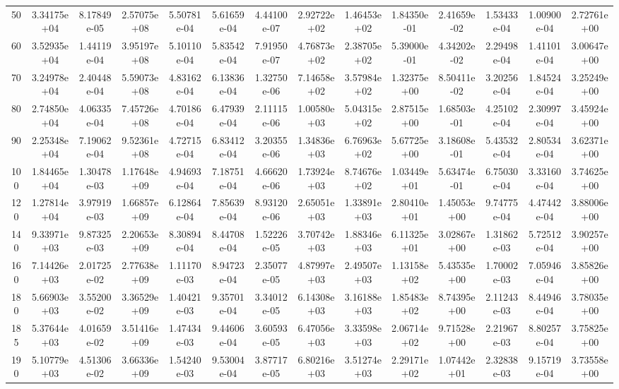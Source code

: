 \documentclass[
prb,
twocolumn,
superscriptaddress,
 amsmath,amssymb,
 aps,
longbibliography,
]{revtex4-2}
\begin{document}
\begin{table}[htbp!]
{\begin{tabular}{cccccccccccccc}
50 & 3.34175e+04 & 8.17849e-05 & 2.57075e+08 & 5.50781e-04 & 5.61659e-04 & 4.44100e-07 & 2.92722e+02 & 1.46453e+02 & 1.84350e-01 & 2.41659e-02 & 1.53433e-04 & 1.00900e-04 & 2.72761e+00\\
60 & 3.52935e+04 & 1.44119e-04 & 3.95197e+08 & 5.10110e-04 & 5.83542e-04 & 7.91950e-07 & 4.76873e+02 & 2.38705e+02 & 5.39000e-01 & 4.34202e-02 & 2.29498e-04 & 1.41101e-04 & 3.00647e+00\\
70 & 3.24978e+04 & 2.40448e-04 & 5.59073e+08 & 4.83162e-04 & 6.13836e-04 & 1.32750e-06 & 7.14658e+02 & 3.57984e+02 & 1.32375e+00 & 8.50411e-02 & 3.20256e-04 & 1.84524e-04 & 3.25249e+00\\
80 & 2.74850e+04 & 4.06335e-04 & 7.45726e+08 & 4.70186e-04 & 6.47939e-04 & 2.11115e-06 & 1.00580e+03 & 5.04315e+02 & 2.87515e+00 & 1.68503e-01 & 4.25102e-04 & 2.30997e-04 & 3.45924e+00\\
90 & 2.25348e+04 & 7.19062e-04 & 9.52361e+08 & 4.72715e-04 & 6.83412e-04 & 3.20355e-06 & 1.34836e+03 & 6.76963e+02 & 5.67725e+00 & 3.18608e-01 & 5.43532e-04 & 2.80534e-04 & 3.62371e+00\\
100 & 1.84465e+04 & 1.30478e-03 & 1.17648e+09 & 4.94693e-04 & 7.18751e-04 & 4.66620e-06 & 1.73924e+03 & 8.74676e+02 & 1.03449e+01 & 5.63474e-01 & 6.75030e-04 & 3.33160e-04 & 3.74625e+00\\
120 & 1.27814e+04 & 3.97919e-03 & 1.66857e+09 & 6.12864e-04 & 7.85639e-04 & 8.93120e-06 & 2.65051e+03 & 1.33891e+03 & 2.80410e+01 & 1.45053e+00 & 9.74775e-04 & 4.47442e-04 & 3.88006e+00\\
140 & 9.33971e+03 & 9.87325e-03 & 2.20653e+09 & 8.30894e-04 & 8.44708e-04 & 1.52226e-05 & 3.70742e+03 & 1.88346e+03 & 6.11325e+01 & 3.02867e+00 & 1.31862e-03 & 5.72512e-04 & 3.90257e+00\\
160 & 7.14426e+03 & 2.01725e-02 & 2.77638e+09 & 1.11170e-03 & 8.94723e-04 & 2.35077e-05 & 4.87997e+03 & 2.49507e+03 & 1.13158e+02 & 5.43535e+00 & 1.70002e-03 & 7.05946e-04 & 3.85826e+00\\
180 & 5.66903e+03 & 3.55200e-02 & 3.36529e+09 & 1.40421e-03 & 9.35701e-04 & 3.34012e-05 & 6.14308e+03 & 3.16188e+03 & 1.85483e+02 & 8.74395e+00 & 2.11243e-03 & 8.44946e-04 & 3.78035e+00\\
185 & 5.37644e+03 & 4.01659e-02 & 3.51416e+09 & 1.47434e-03 & 9.44606e-04 & 3.60593e-05 & 6.47056e+03 & 3.33598e+03 & 2.06714e+02 & 9.71528e+00 & 2.21967e-03 & 8.80257e-04 & 3.75825e+00\\
190 & 5.10779e+03 & 4.51306e-02 & 3.66336e+09 & 1.54240e-03 & 9.53004e-04 & 3.87717e-05 & 6.80216e+03 & 3.51274e+03 & 2.29171e+02 & 1.07442e+01 & 2.32838e-03 & 9.15719e-04 & 3.73558e+00\\

\end{tabular}}
\end{table}
\end{document}
